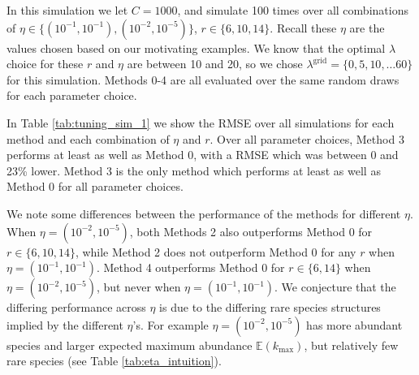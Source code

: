\documentclass[oupdraft]{bio}
\newcommand{\lambdagrid}{\lambda^{\text{grid}}}
\begin{document}

In this simulation we let $C = 1000$, and simulate 100 times over all combinations of $\eta \in \{(10^{-1}, 10^{-1}), (10^{-2}, 10^{-5}) \}$, $r \in \{6, 10, 14\}$.  Recall these $\eta$ are the values chosen based on our motivating examples.  We know that the optimal $\lambda$ choice for these $r$ and $\eta$ are between 10 and 20, so we chose $\lambdagrid = \{0, 5, 10, \dots 60\}$ for this simulation.  Methods 0-4 are all evaluated over the same random draws for each parameter choice.


In Table \ref{tab:tuning_sim_1} we show the RMSE over all simulations for each method and each combination of $\eta$ and $r$.  Over all parameter choices, Method 3 performs at least as well as Method 0, with a RMSE which was between 0 and 23\% lower.  Method 3 is the only method which performs at least as well as Method 0 for all parameter choices.

We note some differences between the performance of the methods for different $\eta.$ When $\eta = (10^{-2},10^{-5})$, both Methods 2 also outperforms Method 0 for $r \in \{6, 10, 14\}$, while Method 2 does not outperform Method 0 for any $r$ when $\eta = (10^{-1},10^{-1})$.  Method 4 outperforms Method 0 for $r \in \{6, 14\}$ when $\eta = (10^{-2},10^{-5})$, but never when $\eta = (10^{-1},10^{-1})$.
We conjecture that the differing performance across $\eta$ is due to the differing rare species structures implied by the different $\eta$'s. For example $\eta = (10^{-2},10^{-5})$ has more abundant species and larger expected maximum abundance $\mathbb{E}(k_{\text{max}})$, but relatively few rare species (see Table \ref{tab:eta_intuition}).

\end{document}
